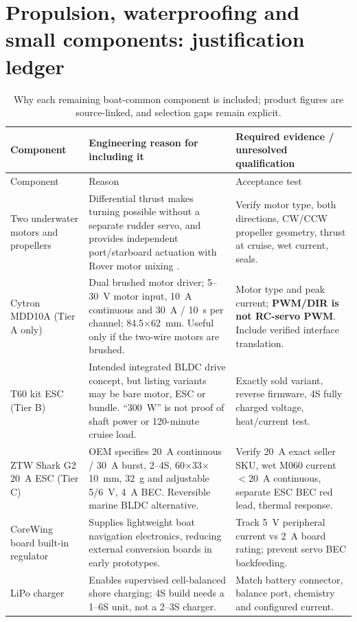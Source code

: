 \section{Propulsion, waterproofing and small components: justification ledger}
\label{sec:auxiliary}
\begin{longtable}{L{40mm}L{78mm}L{44mm}}
\caption{Why each remaining boat-common component is included; product figures are source-linked, and selection gaps remain explicit.}\label{tab:justledger}\\
\toprule Component & Engineering reason for including it & Required evidence / unresolved qualification \\\midrule\endfirsthead
\toprule Component & Reason & Acceptance test \\\midrule\endhead\bottomrule\endfoot
Two underwater motors and propellers \cite{jetShop,hobbyShop,m060Shop} & Differential thrust makes turning possible without a separate rudder servo, and provides independent port/starboard actuation with Rover motor mixing \cite{boat,motor}. & Verify motor type, both directions, CW/CCW propeller geometry, thrust at cruise, wet current, seals.\\
Cytron MDD10A (Tier A only) \cite{mdd10} & Dual brushed motor driver; 5--30~V motor input, 10~A continuous and 30~A / 10~s per channel; 84.5$\times$62~mm. Useful only if the two-wire motors are brushed. & Motor type and peak current; \textbf{PWM/DIR is not RC-servo PWM}. Include verified interface translation.\\
T60 kit ESC (Tier B) \cite{hobbyShop,hobbyRef} & Intended integrated BLDC drive concept, but listing variants may be bare motor, ESC or bundle. ``300~W'' is not proof of shaft power or 120-minute cruise load. & Exactly sold variant, reverse firmware, 4S fully charged voltage, heat/current test.\\
ZTW Shark G2 20~A ESC (Tier C) \cite{ztwDoc,ztwShop} & OEM specifies 20~A continuous / 30~A burst, 2--4S, 60$\times$33$\times$10~mm, 32~g and adjustable 5/6~V, 4~A BEC. Reversible marine BLDC alternative. & Verify 20~A exact seller SKU, wet M060 current $<20$~A continuous, separate ESC BEC red lead, thermal response.\\
CoreWing board built-in regulator \cite{coreDoc} & Supplies lightweight boat navigation electronics, reducing external conversion boards in early prototypes. & Track 5~V peripheral current vs 2~A board rating; prevent servo BEC backfeeding.\\
LiPo charger \cite{charger,charger4} & Enables supervised cell-balanced shore charging; 4S build needs a 1--6S unit, not a 2--3S charger. & Match battery connector, balance port, chemistry and configured current.\\

\end{longtable}

